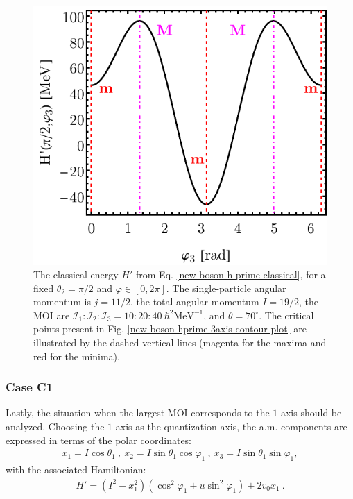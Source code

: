\begin{figure}
    \begin{center}
        \includegraphics[scale=0.8]{Chapters/Figures/New-Boson-Classical-H-3-axis-varphi-plot.pdf}
        \caption{The classical energy $H'$ from Eq. \ref{new-boson-h-prime-classical}, for a fixed $\theta_2=\pi/2$ and $\varphi\in[0,2\pi]$. The single-particle angular momentum is $j=11/2$, the total angular momentum $I=19/2$, the MOI are $\mathcal{I}_1:\mathcal{I}_2:\mathcal{I}_3=10:20:40\ \hbar^2\text{MeV}^{-1}$, and $\theta=70^\circ$. The critical points present in Fig. \ref{new-boson-hprime-3axis-contour-plot} are illustrated by the dashed vertical lines (magenta for the maxima and red for the minima).}
        \label{new-boson-hprime-3axis-varphi-plot}
    \end{center}
\end{figure}

\subsubsection*{Case C1}

Lastly, the situation when the largest MOI corresponds to the $1$-axis should be analyzed. Choosing the $1$-axis as the quantization axis, the a.m. components are expressed in terms of the polar coordinates:
\begin{align}
    x_1=I\cos\theta_1\ ,\ x_2=I\sin\theta_1\cos\varphi_1\ ,\ x_3=I\sin\theta_1\sin\varphi_1,
    \label{polar-coordinates-case-c1}
\end{align}
with the associated Hamiltonian:
\begin{align}
    H'=\left(I^2-x_1^2\right)\left(\cos^2\varphi_1+u\sin^2\varphi_1\right)+2v_0x_1\ .
    \label{classical-energy-new-boson-1-axis}
\end{align}

